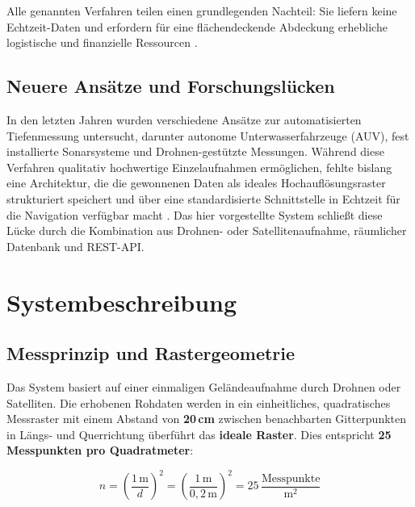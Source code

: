 ﻿\documentclass[a4paper,12pt]{article}
\theoremstyle{definition}
\begin{document}
\noindent
Alle genannten Verfahren teilen einen grundlegenden Nachteil: Sie liefern keine
Echtzeit-Daten und erfordern für eine flächendeckende Abdeckung erhebliche logistische
und finanzielle Ressourcen \cite{guenther2000, parente2020}.

\subsection{Neuere Ansätze und Forschungslücken}

In den letzten Jahren wurden verschiedene Ans\"{a}tze zur automatisierten Tiefenmessung
untersucht, darunter autonome Unterwasserfahrzeuge (AUV), fest installierte Sonarsysteme
und Drohnen-gest\"{u}tzte Messungen. W\"{a}hrend diese Verfahren qualitativ hochwertige
Einzelaufnahmen erm\"{o}glichen, fehlte bislang eine Architektur, die die gewonnenen Daten
als ideales Hochaufl\"{o}sungsraster strukturiert speichert und \"{u}ber eine standardisierte
Schnittstelle in Echtzeit f\"{u}r die Navigation verf\"{u}gbar macht \cite{argo2021, stationary2022}.
Das hier vorgestellte System schlie\ss{}t diese L\"{u}cke durch die Kombination aus
Drohnen- oder Satelliten\-aufnahme, r\"{a}umlicher Datenbank und REST-API.

\section{Systembeschreibung}

\subsection{Messprinzip und Rastergeometrie}

Das System basiert auf einer einmaligen Geländeaufnahme durch Drohnen oder Satelliten.
Die erhobenen Rohdaten werden in ein einheitliches, quadratisches Messraster mit einem
Abstand von \textbf{20\,cm} zwischen benachbarten Gitterpunkten in Längs- und Querrichtung
überführt \textendash{} das \textbf{ideale Raster}. Dies entspricht
\textbf{25 Messpunkten pro Quadratmeter}:

\begin{equation}
  n = \left(\frac{1\,\text{m}}{d}\right)^2 = \left(\frac{1\,\text{m}}{0{,}2\,\text{m}}\right)^2 = 25\, \frac{\text{Messpunkte}}{\text{m}^2}
  \label{eq:aufloesung}
\end{equation}
\end{document}
